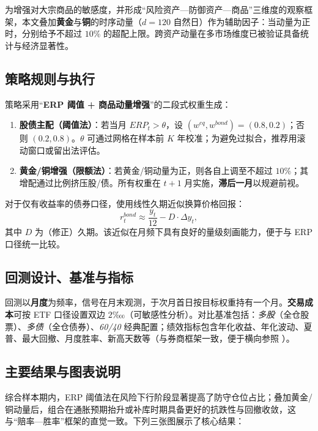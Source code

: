 \documentclass[a4paper,12pt]{article}
\numberwithin{equation}{section}
\begin{document}
为增强对大宗商品的敏感度，并形成“风险资产—防御资产—商品”三维度的观察框架，本文叠加\textbf{黄金}与\textbf{铜}的时序动量（$d=120$ 自然日）作为辅助因子：当动量为正时，分别给予不超过 $10\%$ 的超配上限。跨资产动量在多市场维度已被验证具备统计与经济显著性\cite{Moskowitz2012,Asness2013}。

\subsection{策略规则与执行} \label{sec:rules}
策略采用“\textbf{ERP 阈值 + 商品动量增强}”的二段式权重生成：
\begin{enumerate}
  \item \textbf{股债主配（阈值法）}：若当月 $ERP_t>\theta$，设 $(w^{eq},w^{bond})=(0.8,0.2)$；否则 $(0.2,0.8)$。$\theta$ 可通过网格在样本前 $K$ 年校准；为避免过拟合，推荐用滚动窗口或留出法评估。
  \item \textbf{黄金/铜增强（限额法）}：若黄金/铜动量为正，则各自上调至不超过 $10\%$；其增配通过比例挤压股/债。所有权重在 $t+1$ 月实施，\textbf{滞后一月}以规避前视。
\end{enumerate}
对于仅有收益率的债券口径，使用线性久期近似换算价格回报：
\begin{equation}
  r^{bond}_t \approx \frac{y_t}{12} - D \cdot \Delta y_t,
  \label{eq:duration}
\end{equation}
其中 $D$ 为（修正）久期。该近似在月频下具有良好的量级刻画能力，便于与 ERP 口径统一比较。

\subsection{回测设计、基准与指标} \label{sec:bt}
回测以\textbf{月度}为频率，信号在月末观测，于次月首日按目标权重持有一个月。\textbf{交易成本}可按 ETF 口径设置双边 $2$‱（可敏感性分析）。对比基准包括：\emph{多股}（全仓股票）、\emph{多债}（全仓债券）、\emph{60/40} 经典配置；绩效指标包含年化收益、年化波动、夏普、最大回撤、月度胜率、新高天数等（与券商框架一致，便于横向参照 \cite{HT2024_odds,CSC2025_cycle,HT2024_riskparity}）。

\subsection{主要结果与图表说明} \label{sec:results}
综合样本期内，ERP 阈值法在风险下行阶段显著提高了防守仓位占比；叠加黄金/铜动量后，组合在通胀预期抬升或补库时期具备更好的抗跌性与回撤收敛，这与“赔率—胜率”框架的直觉一致\cite{HT2024_odds}。下列三张图展示了核心结果：
\end{document}
